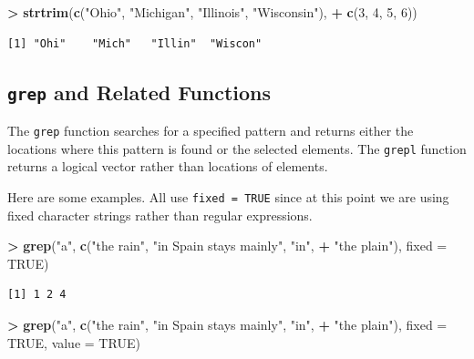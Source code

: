 \documentclass[]{krantz}
\makeatletter
\newenvironment{Shaded}{\begin{snugshade}}{\end{snugshade}}
\newcommand{\DataTypeTok}[1]{\textcolor[rgb]{0.27,0.27,0.27}{#1}}
\newcommand{\DecValTok}[1]{\textcolor[rgb]{0.06,0.06,0.06}{#1}}
\newcommand{\KeywordTok}[1]{\textcolor[rgb]{0.27,0.27,0.27}{\textbf{#1}}}
\newcommand{\NormalTok}[1]{#1}
\newcommand{\OperatorTok}[1]{\textcolor[rgb]{0.43,0.43,0.43}{\textbf{#1}}}
\newcommand{\OtherTok}[1]{\textcolor[rgb]{0.37,0.37,0.37}{#1}}
\newcommand{\StringTok}[1]{\textcolor[rgb]{0.5,0.5,0.5}{#1}}
\newenvironment{kframe}{%
\medskip{}
\setlength{\fboxsep}{.8em}
 \def\at@end@of@kframe{}%
 \ifinner\ifhmode%
  \def\at@end@of@kframe{\end{minipage}}%
  \begin{minipage}{\columnwidth}%
 \fi\fi%
 \def\FrameCommand##1{\hskip\@totalleftmargin \hskip-\fboxsep
 \colorbox{shadecolor}{##1}\hskip-\fboxsep
     \hskip-\linewidth \hskip-\@totalleftmargin \hskip\columnwidth}%
 \MakeFramed {\advance\hsize-\width
   \@totalleftmargin\z@ \linewidth\hsize
   \@setminipage}}%
 {\par\unskip\endMakeFramed%
 \at@end@of@kframe}
\renewenvironment{Shaded}{\begin{kframe}}{\end{kframe}}
\makeatother
\begin{document}
\begin{Shaded}
\begin{Highlighting}[]
\OperatorTok{>}\StringTok{ }\KeywordTok{strtrim}\NormalTok{(}\KeywordTok{c}\NormalTok{(}\StringTok{"Ohio"}\NormalTok{, }\StringTok{"Michigan"}\NormalTok{, }\StringTok{"Illinois"}\NormalTok{, }\StringTok{"Wisconsin"}\NormalTok{), }
\OperatorTok{+}\StringTok{   }\KeywordTok{c}\NormalTok{(}\DecValTok{3}\NormalTok{, }\DecValTok{4}\NormalTok{, }\DecValTok{5}\NormalTok{, }\DecValTok{6}\NormalTok{))}
\end{Highlighting}
\end{Shaded}

\begin{verbatim}
[1] "Ohi"    "Mich"   "Illin"  "Wiscon"
\end{verbatim}

\hypertarget{grep-and-related-functions}{%
\subsection{\texorpdfstring{\texttt{grep} and Related Functions}{grep and Related Functions}}\label{grep-and-related-functions}}

The \texttt{grep} function searches for a specified pattern and returns either the locations where this pattern is found or the selected elements. The \texttt{grepl} function returns a logical vector rather than locations of elements.

Here are some examples. All use \texttt{fixed\ =\ TRUE} since at this point we are using fixed character strings rather than regular expressions.

\begin{Shaded}
\begin{Highlighting}[]
\OperatorTok{>}\StringTok{ }\KeywordTok{grep}\NormalTok{(}\StringTok{"a"}\NormalTok{, }\KeywordTok{c}\NormalTok{(}\StringTok{"the rain"}\NormalTok{, }\StringTok{"in Spain    stays mainly"}\NormalTok{, }\StringTok{"in"}\NormalTok{, }
\OperatorTok{+}\StringTok{   "the plain"}\NormalTok{), }\DataTypeTok{fixed =} \OtherTok{TRUE}\NormalTok{)}
\end{Highlighting}
\end{Shaded}

\begin{verbatim}
[1] 1 2 4
\end{verbatim}

\begin{Shaded}
\begin{Highlighting}[]
\OperatorTok{>}\StringTok{ }\KeywordTok{grep}\NormalTok{(}\StringTok{"a"}\NormalTok{, }\KeywordTok{c}\NormalTok{(}\StringTok{"the rain"}\NormalTok{, }\StringTok{"in Spain    stays mainly"}\NormalTok{, }\StringTok{"in"}\NormalTok{, }
\OperatorTok{+}\StringTok{   "the plain"}\NormalTok{), }\DataTypeTok{fixed =} \OtherTok{TRUE}\NormalTok{, }\DataTypeTok{value =} \OtherTok{TRUE}\NormalTok{)}
\end{Highlighting}
\end{Shaded}
\end{document}
